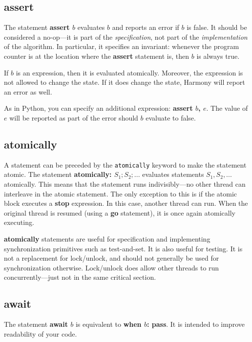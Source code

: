 \documentclass{report}
\begin{document}
\subsection*{\textbf{assert}}

The statement \textbf{assert $b$} evaluates $b$ and reports an error
if $b$ is false.  It should be considered a no-op---it is part of the
\emph{specification}, not part of the \emph{implementation} of the algorithm.
In particular, it specifies an invariant: whenever the program counter is
at the location where the \textbf{assert} statement is, then $b$ is
always true.

If $b$ is an expression, then it is evaluated atomically.
Moreover, the expression is not allowed to change the state.
If it does change the state, Harmony will report an error as well.

As in Python, you can specify an additional expression:
\textbf{assert $b$, $e$}.  The value of $e$ will be reported as part
of the error should $b$ evaluate to false.

\subsection*{\textbf{atomically}}

A statement can be preceded by the \texttt{atomically} keyword to
make the statement atomic.
The statement \textbf{atomically: $S_1; S_2; ...$} evaluates statements
$S_1, S_2, ...$ atomically.
This means that the statement runs indivisibly---no other thread can
interleave in the atomic statement.  The only exception
to this is if the atomic block executes a \textbf{stop} expression.
In this case, another thread can run.  When the original thread
is resumed (using a \textbf{go} statement), it is once again
atomically executing.

\textbf{atomically} statements are useful for specification and
implementing synchronization primitives such as test-and-set.
It is also useful for testing.
It is not a replacement for lock/unlock, and should not generally be used
for synchronization otherwise.  Lock/unlock does allow other
threads to run concurrently---just not in the same critical section.

\subsection*{\textbf{await}}

The statement \textbf{await $b$} is equivalent to \textbf{when $b$: pass}.
It is intended to improve readability of your code.
\end{document}
